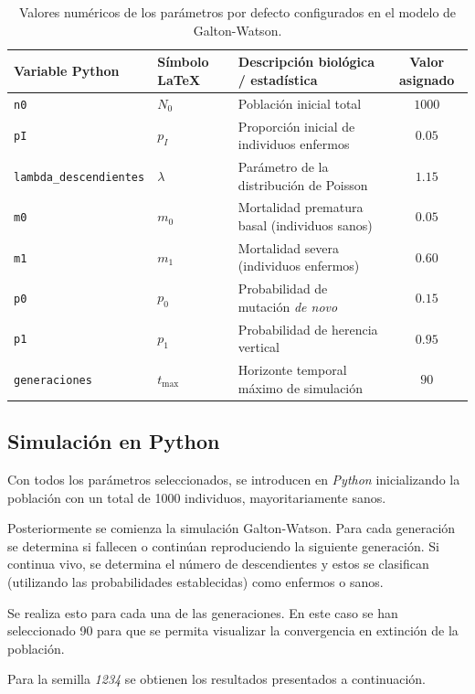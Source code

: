 \documentclass[graybox]{SNmult}
\begin{document}
	\begin{table}[htbp]
		\caption{Valores numéricos de los parámetros por defecto configurados en el modelo de Galton-Watson.}
		\label{tab:configuracion_parametros}
		\centering
		\begin{tabular}{lllc}
			\hline
			\textbf{Variable Python} & \textbf{Símbolo LaTeX} & \textbf{Descripción biológica / estadística} & \textbf{Valor asignado} \\
			\hline
			\texttt{n0} & $N_0$ & Población inicial total & $1000$ \\
			\texttt{pI} & $p_I$ & Proporción inicial de individuos enfermos & $0.05$ \\
			\texttt{lambda\_descendientes} & $\lambda$ & Parámetro de la distribución de Poisson & $1.15$ \\
			\texttt{m0} & $m_0$ & Mortalidad prematura basal (individuos sanos) & $0.05$ \\
			\texttt{m1} & $m_1$ & Mortalidad severa (individuos enfermos) & $0.60$ \\
			\texttt{p0} & $p_0$ & Probabilidad de mutación \textit{de novo} & $0.15$ \\
			\texttt{p1} & $p_1$ & Probabilidad de herencia vertical & $0.95$ \\
			\texttt{generaciones} & $t_{\max}$ & Horizonte temporal máximo de simulación & $90$ \\
			\hline
		\end{tabular}
	\end{table}
	
	\subsection{Simulación en Python}
	Con todos los parámetros seleccionados, se introducen en \textit{Python} inicializando la población con un total de 1000 individuos, mayoritariamente sanos. 
	
	Posteriormente se comienza la simulación Galton-Watson. Para cada generación se determina si fallecen o continúan reproduciendo la siguiente generación. Si continua vivo, se determina el número de descendientes y estos se clasifican (utilizando las probabilidades establecidas) como enfermos o sanos. 
	
	Se realiza esto para cada una de las generaciones. En este caso se han seleccionado 90 para que se permita visualizar la convergencia en extinción de la población. 
	
	Para la semilla \textit{1234} se obtienen los resultados presentados a continuación. 
	
\end{document}
